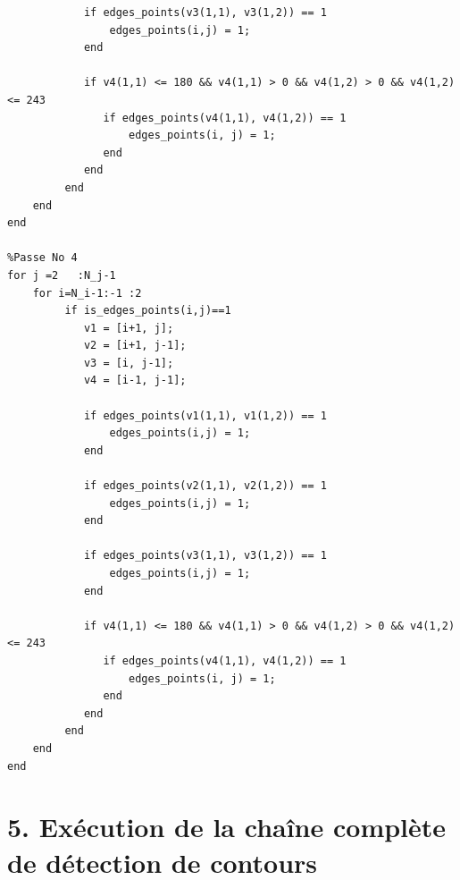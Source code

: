 \documentclass{article}
\begin{document}
\begin{itemize}
\begin{lstlisting}
            if edges_points(v3(1,1), v3(1,2)) == 1
                edges_points(i,j) = 1;
            end
            
            if v4(1,1) <= 180 && v4(1,1) > 0 && v4(1,2) > 0 && v4(1,2) <= 243
               if edges_points(v4(1,1), v4(1,2)) == 1
                   edges_points(i, j) = 1;
               end
            end
         end
    end
end

%Passe No 4
for j =2   :N_j-1
    for i=N_i-1:-1 :2
         if is_edges_points(i,j)==1
            v1 = [i+1, j];
            v2 = [i+1, j-1];
            v3 = [i, j-1];
            v4 = [i-1, j-1];

            if edges_points(v1(1,1), v1(1,2)) == 1
                edges_points(i,j) = 1;
            end
            
            if edges_points(v2(1,1), v2(1,2)) == 1
                edges_points(i,j) = 1;
            end
            
            if edges_points(v3(1,1), v3(1,2)) == 1
                edges_points(i,j) = 1;
            end
            
            if v4(1,1) <= 180 && v4(1,1) > 0 && v4(1,2) > 0 && v4(1,2) <= 243
               if edges_points(v4(1,1), v4(1,2)) == 1
                   edges_points(i, j) = 1;
               end
            end
         end
    end
end
\end{lstlisting}
\end{itemize}

\section*{5. Exécution de la chaîne complète de détection de contours}
\end{document}

